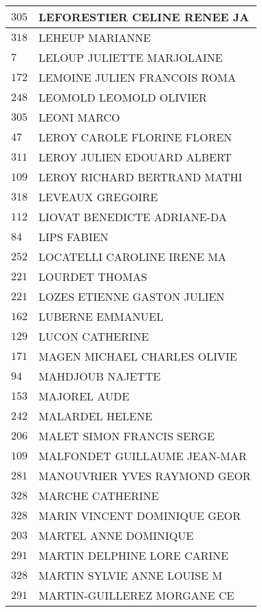 \begin{xltabular}{\linewidth}{|l|X|}
    \hline
    $305$ & LEFORESTIER CELINE RENEE JA \\
    \hline
    $318$ & LEHEUP MARIANNE \\
    \hline
    $7$ & LELOUP JULIETTE MARJOLAINE \\
    \hline
    $172$ & LEMOINE JULIEN FRANCOIS ROMA \\
    \hline
    $248$ & LEOMOLD LEOMOLD OLIVIER \\
    \hline
    $305$ & LEONI MARCO \\
    \hline
    $47$ & LEROY CAROLE FLORINE FLOREN \\
    \hline
    $311$ & LEROY JULIEN EDOUARD ALBERT \\
    \hline
    $109$ & LEROY RICHARD BERTRAND MATHI \\
    \hline
    $318$ & LEVEAUX GREGOIRE \\
    \hline
    $112$ & LIOVAT BENEDICTE ADRIANE-DA \\
    \hline
    $84$ & LIPS FABIEN \\
    \hline
    $252$ & LOCATELLI CAROLINE IRENE MA \\
    \hline
    $221$ & LOURDET THOMAS \\
    \hline
    $221$ & LOZES ETIENNE GASTON JULIEN \\
    \hline
    $162$ & LUBERNE EMMANUEL \\
    \hline
    $129$ & LUCON CATHERINE \\
    \hline
    $171$ & MAGEN MICHAEL CHARLES OLIVIE \\
    \hline
    $94$ & MAHDJOUB NAJETTE \\
    \hline
    $153$ & MAJOREL AUDE \\
    \hline
    $242$ & MALARDEL HELENE \\
    \hline
    $206$ & MALET SIMON FRANCIS SERGE \\
    \hline
    $109$ & MALFONDET GUILLAUME JEAN-MAR \\
    \hline
    $281$ & MANOUVRIER YVES RAYMOND GEOR \\
    \hline
    $328$ & MARCHE CATHERINE \\
    \hline
    $328$ & MARIN VINCENT DOMINIQUE GEOR \\
    \hline
    $203$ & MARTEL ANNE DOMINIQUE \\
    \hline
    $291$ & MARTIN DELPHINE LORE CARINE \\
    \hline
    $328$ & MARTIN SYLVIE ANNE LOUISE M \\
    \hline
    $291$ & MARTIN-GUILLEREZ MORGANE CE \\

\end{xltabular}
